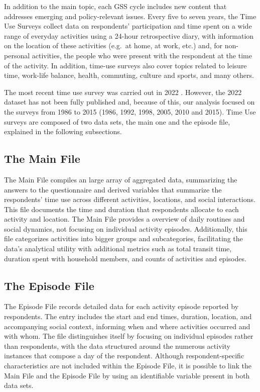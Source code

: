 \documentclass[Royal,times,sageh]{sagej}
\begin{document}
In addition to the main topic, each GSS cycle includes new content that
addresses emerging and policy-relevant issues. Every five to seven
years, the Time Use Surveys \citep{statisticscanada2022} collect data on
respondents' participation and time spent on a wide range of everyday
activities using a 24-hour retrospective diary, with information on the
location of these activities (e.g.~at home, at work, etc.) and, for
non-personal activities, the people who were present with the respondent
at the time of the activity. In addition, time-use surveys also cover
topics related to leisure time, work-life balance, health, commuting,
culture and sports, and many others.

The most recent time use survey was carried out in 2022
\citep{wray2024}. However, the 2022 dataset has not been fully published
and, because of this, our analysis focused on the surveys from 1986 to
2015 (1986, 1992, 1998, 2005, 2010 and 2015). Time Use surveys are
composed of two data sets, the main one and the episode file, explained
in the following subsections.

\hypertarget{the-main-file}{%
\subsection{The Main File}\label{the-main-file}}

The Main File compiles an large array of aggregated data, summarizing
the answers to the questionnaire and derived variables that summarize
the respondents' time use across different activities, locations, and
social interactions. This file documents the time and duration that
respondents allocate to each activity and location. The Main File
provides a overview of daily routines and social dynamics, not focusing
on individual activity episodes. Additionally, this file categorizes
activities into bigger groups and subcategories, facilitating the data's
analytical utility with additional metrics such as total transit time,
duration spent with household members, and counts of activities and
episodes.

\hypertarget{the-episode-file}{%
\subsection{The Episode File}\label{the-episode-file}}

The Episode File records detailed data for each activity episode
reported by respondents. The entry includes the start and end times,
duration, location, and accompanying social context, informing when and
where activities occurred and with whom. The file distinguishes itself
by focusing on individual episodes rather than respondents, with the
data structured around the numerous activity instances that compose a
day of the respondent. Although respondent-specific characteristics are
not included within the Episode File, it is possible to link the Main
File and the Episode File by using an identifiable variable present in
both data sets.
\end{document}

